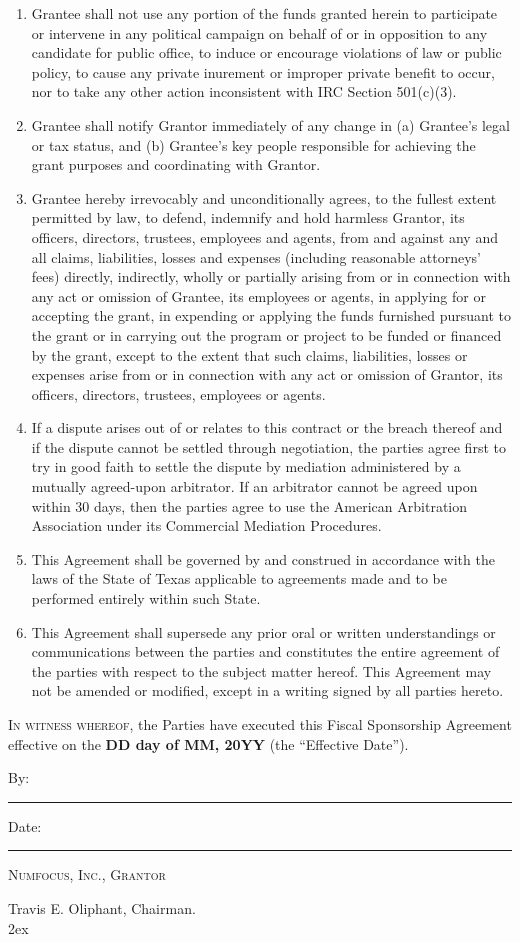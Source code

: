 \documentclass[english,letterpaper,12pt]{article}
\newcommand{\agreementdate}{\textbf{DD day of MM, 20YY}}
\newcommand{\chairmansig}[1]{
By: \hspace{0.95em}\rule{0.50\textwidth}{0.2mm} \hfill{}Date: \rule{0.25\textwidth}{0.2mm}

\hspace{2.5em} \textsc{Numfocus, Inc., Grantor}

\hspace{2.5em} Travis E. Oliphant, Chairman.  \\[4ex]
}
\begin{document}
\begin{enumerate}[align=parleft]
\item Grantee shall not use any portion of the funds granted herein to participate or intervene in any political campaign on behalf of or in opposition to any candidate for public office, to induce or encourage violations of law or public policy, to cause any private inurement or improper private benefit to occur, nor to take any other action inconsistent with IRC Section 501(c)(3). 

\item Grantee shall notify Grantor immediately of any change in (a) Grantee's legal or tax status, and (b) Grantee's key people responsible for achieving the grant purposes and coordinating with Grantor.  

\item Grantee hereby irrevocably and unconditionally agrees, to the fullest extent permitted by law, to defend, indemnify and hold harmless Grantor, its officers, directors, trustees, employees and agents, from and against any and all claims, liabilities, losses and expenses (including reasonable attorneys' fees) directly, indirectly, wholly or partially arising from or in connection with any act or omission of Grantee, its employees or agents, in applying for or accepting the grant, in expending or applying the funds furnished pursuant to the grant or in carrying out the program or project to be funded or financed by the grant, except to the extent that such claims, liabilities, losses or expenses arise from or in connection with any act or omission of Grantor, its officers, directors, trustees, employees or agents. 

\item If a dispute arises out of or relates to this contract or the breach thereof and if the dispute cannot be settled through negotiation, the parties agree first to try in good faith to settle the dispute by mediation administered by a mutually agreed-upon arbitrator.  If an arbitrator cannot be agreed upon within 30 days, then the parties agree to use the American Arbitration Association under its Commercial Mediation Procedures.

\item This Agreement shall be governed by and construed in accordance with the laws of the State of Texas applicable to agreements made and to be performed entirely within such State.

\item This Agreement shall supersede any prior oral or written understandings or communications between the parties and constitutes the entire agreement of the parties with respect to the subject matter hereof. This Agreement may not be amended or modified, except in a writing signed by all parties hereto. 


\end{enumerate}

\medskip{}

\textsc{In witness whereof}, the Parties have executed this Fiscal
Sponsorship Agreement effective on the \agreementdate{} (the
``Effective Date'').

\vspace{3em}

\chairmansig

\vspace{2ex}


\end{document}
